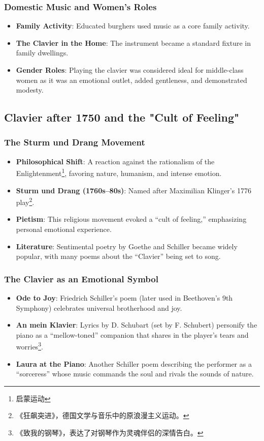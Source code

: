 \documentclass[math,code]{amznotes}
\theoremstyle{remark}
\begin{document}
\subsubsection{Domestic Music and Women's Roles}
\begin{itemize}
    \item \textbf{Family Activity}: Educated burghers used music as a core family activity.
    \item \textbf{The Clavier in the Home}: The instrument became a standard fixture in family dwellings.
    \item \textbf{Gender Roles}: Playing the clavier was considered ideal for middle-class women as it was an emotional outlet, added gentleness, and demonstrated modesty.
\end{itemize}

\subsection{Clavier after 1750 and the "Cult of Feeling"}

\subsubsection{The Sturm und Drang Movement}
\begin{itemize}
    \item \textbf{Philosophical Shift}: A reaction against the rationalism of the Enlightenment\footnote{启蒙运动}, favoring nature, humanism, and intense emotion.
    \item \textbf{Sturm und Drang (1760s--80s)}: Named after Maximilian Klinger's 1776 play\footnote{《狂飙突进》，德国文学与音乐中的原浪漫主义运动。}.
    \item \textbf{Pietism}: This religious movement evoked a ``cult of feeling,'' emphasizing personal emotional experience.
    \item \textbf{Literature}: Sentimental poetry by Goethe and Schiller became widely popular, with many poems about the ``Clavier'' being set to song.
\end{itemize}

\subsubsection{The Clavier as an Emotional Symbol}
\begin{itemize}
    \item \textbf{Ode to Joy}: Friedrich Schiller's poem (later used in Beethoven's 9th Symphony) celebrates universal brotherhood and joy.
    \item \textbf{An mein Klavier}: Lyrics by D. Schubart (set by F. Schubert) personify the piano as a ``mellow-toned'' companion that shares in the player's tears and worries\footnote{《致我的钢琴》，表达了对钢琴作为灵魂伴侣的深情告白。}.
    \item \textbf{Laura at the Piano}: Another Schiller poem describing the performer as a ``sorceress'' whose music commands the soul and rivals the sounds of nature.
\end{itemize}
\end{document}
